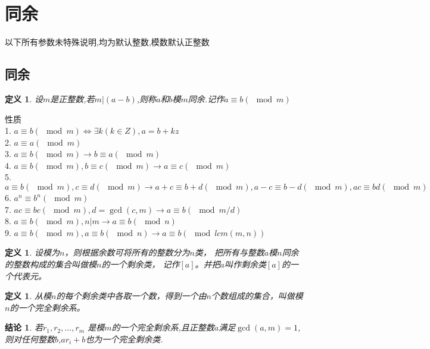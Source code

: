 \documentclass[12pt, a4paper, oneside]{ctexbook}
\newtheorem{definition}[theorem]{定义}
\newtheorem{proposition}[theorem]{结论}
\begin{document}
\section{同余}
以下所有参数未特殊说明,均为默认整数,模数默认正整数\\

\subsection{同余}

\begin{definition}
  设$m$是正整数,若$m|(a-b)$,则称$a$和$b$模$m$同余.记作$a \equiv b(\mod m)$
\end{definition}

性质\\
1. $a \equiv b (\mod m) \iff \exists k (k\in Z),a=b+kz$\\
2. $a \equiv a(\mod m)$\\
3. $a \equiv b(\mod m) \rightarrow b \equiv a(\mod m)$\\
4. $a \equiv b(\mod m),b \equiv c(\mod m) \rightarrow a \equiv c(\mod m)$\\
5. $a \equiv b(\mod m),c \equiv d(\mod m)\rightarrow a+c \equiv b+d(\mod m) ,a-c \equiv b-d(\mod m),ac \equiv bd(\mod m)$\\
6. $a^n \equiv b^n(\mod m)$\\
7. $ac \equiv bc (\mod m),d=\gcd(c,m)\rightarrow a \equiv b (\mod m/d)$\\
8. $a \equiv b (\mod m),n|m \rightarrow a \equiv b (\mod n)$\\
9. $a \equiv b (\mod m),a \equiv b (\mod n)\rightarrow a \equiv b (\mod lcm(m,n))$\\


\begin{definition}
  设模为$n$，则根据余数可将所有的整数分为$n$类，
  把所有与整数$a$模$n$同余的整数构成的集合叫做模$n$的一个剩余类，
  记作$[a]$。并把$a$叫作剩余类$[a]$的一个代表元。
\end{definition}

\begin{definition}
  从模$n$的每个剩余类中各取一个数，得到一个由$n$个数组成的集合，叫做模$n$的一个完全剩余系。
\end{definition}

\begin{proposition}
  若$r_1,r_2,\dots ,r_m$ 是模$m$的一个完全剩余系,且正整数$a$满足$\gcd(a,m)=1$,则对任何整数$b$,$ar_i+b$也为一个完全剩余类.
\end{proposition}
\end{document}
